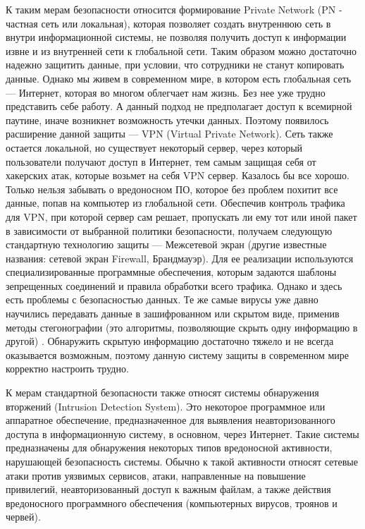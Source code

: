 К таким мерам безопасности относится формирование Private Network (PN - частная сеть или локальная), которая позволяет создать внутреннюю сеть в внутри информационной системы, не позволяя получить доступ к информации извне и из внутренней сети к глобальной сети. Таким образом можно достаточно надежно защитить данные, при условии, что сотрудники не станут копировать данные. Однако мы живем в современном мире, в котором есть глобальная сеть --- Интернет, которая во многом облегчает нам жизнь. Без нее уже трудно представить себе работу. А данный подход не предполагает доступ к всемирной паутине, иначе возникнет возможность утечки данных. Поэтому появилось расширение данной защиты --- VPN (Virtual Private Network). Сеть также остается локальной, но существует некоторый сервер, через который пользователи получают доступ в Интернет, тем самым защищая себя от хакерских атак, которые возьмет на себя VPN сервер. Казалось бы все хорошо. Только нельзя забывать о вредоносном ПО, которое без проблем похитит все данные, попав на компьютер из глобальной сети. Обеспечив контроль трафика для VPN, при которой сервер сам решает, пропускать ли ему тот или иной пакет в зависимости от выбранной политики безопасности, получаем следующую стандартную технологию защиты --- Межсетевой экран (другие известные названия: сетевой экран Firewall, Брандмауэр). Для ее реализации используются специализированные программные обеспечения, которым задаются шаблоны зепрещенных соединений и правила обработки всего трафика. Однако и здесь есть проблемы с безопасностью данных. Те же самые вирусы уже давно научились передавать данные в зашифрованном или скрытом виде, применив методы стегонографии (это алгоритмы, позволяющие скрыть одну информацию в другой) . Обнаружить скрытую информацию достаточно тяжело и не всегда оказывается возможным, поэтому данную систему защиты в современном мире корректно настроить трудно.

К мерам стандартной безопасности также относят системы обнаружения вторжений (Intrusion Detection System). Это некоторое программное или аппаратное обеспечение, предназначенное для выявления неавторизованного доступа в информационную систему, в основном, через Интернет. Такие системы предназначены для обнаружения некоторых типов вредоносной активности, нарушающей безопасность системы. Обычно к такой активности относят сетевые атаки против уязвимых сервисов, атаки, направленные на повышение привилегий, неавторизованный доступ к важным файлам, а также действия вредоносного программного обеспечения (компьютерных вирусов, троянов и червей).

